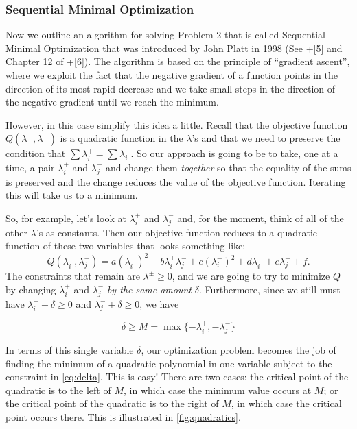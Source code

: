 \documentclass[
]{article}
\begin{document}
\hypertarget{sequential-minimal-optimization}{%
\subsubsection{Sequential Minimal
Optimization}\label{sequential-minimal-optimization}}

Now we outline an algorithm for solving Problem 2 that is called
Sequential Minimal Optimization that was introduced by John Platt in
1998 (See +{[}\protect\hyperlink{ref-plattSMO}{5}{]} and Chapter 12 of
+{[}\protect\hyperlink{ref-KernelMethodAdvances}{6}{]}). The algorithm
is based on the principle of ``gradient ascent'', where we exploit the
fact that the negative gradient of a function points in the direction of
its most rapid decrease and we take small steps in the direction of the
negative gradient until we reach the minimum.

However, in this case simplify this idea a little. Recall that the
objective function \(Q(\lambda^{+},\lambda^{-})\) is a quadratic
function in the \(\lambda\)'s and that we need to preserve the condition
that \(\sum \lambda^{+}_{i}=\sum\lambda^{-}_{i}\). So our approach is
going to be to take, one at a time, a pair \(\lambda^{+}_{i}\) and
\(\lambda^{-}_{j}\) and change them \emph{together} so that the equality
of the sums is preserved and the change reduces the value of the
objective function. Iterating this will take us to a minimum.

So, for example, let's look at \(\lambda^{+}_i\) and \(\lambda^{-}_{j}\)
and, for the moment, think of all of the other \(\lambda\)'s as
constants. Then our objective function reduces to a quadratic function
of these two variables that looks something like: \[
Q(\lambda_{i}^{+},\lambda_{j}^{-}) = a(\lambda^{+}_i)^2+b\lambda^{+}_i\lambda^{-}_j+c(\lambda^{-}_{i})^2+d\lambda^{+}_i+e\lambda^{-}_{j}+f.
\] The constraints that remain are \(\lambda^{\pm}\ge 0\), and we are
going to try to minimize \(Q\) by changing \(\lambda_{i}^{+}\) and
\(\lambda_{j}^{-}\) \emph{by the same amount} \(\delta\). Furthermore,
since we still must have \(\lambda_{i}^{+}+\delta\ge 0\) and
\(\lambda_{j}^{-}+\delta\ge 0\), we have

\begin{equation}
\delta\ge M=\max\{-\lambda_{i}^{+},-\lambda_{j}^{-}\}
\label{eq:delta}\end{equation}

In terms of this single variable \(\delta\), our optimization problem
becomes the job of finding the minimum of a quadratic polynomial in one
variable subject to the constraint in \cref{eq:delta}. This is easy!
There are two cases: the critical point of the quadratic is to the left
of \(M\), in which case the minimum value occurs at \(M\); or the
critical point of the quadratic is to the right of \(M\), in which case
the critical point occurs there. This is illustrated in
\cref{fig:quadratics}.
\end{document}
